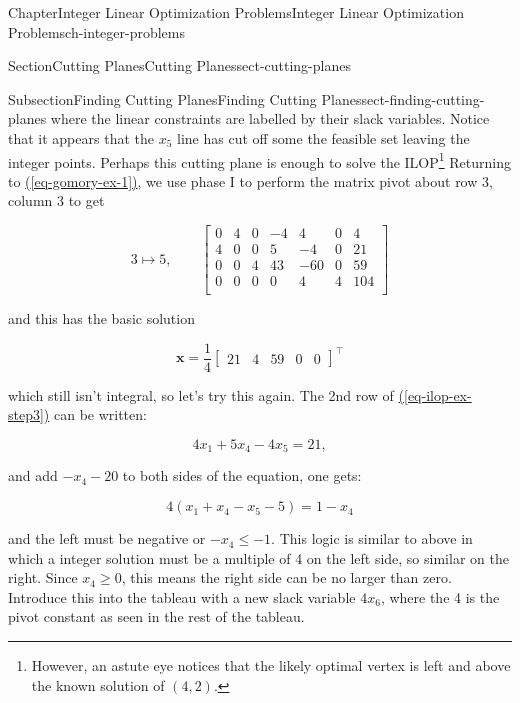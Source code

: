 \documentclass[oneside,10pt,]{book}
\newcommand{\xreffont}{\relax}
\numberwithin{equation}{section}
\newcommand{\amp}{&}
\begin{document}
\begin{chapterptx}{Chapter}{Integer Linear Optimization Problems}{}{Integer Linear Optimization Problems}{}{}{ch-integer-problems}
\begin{sectionptx}{Section}{Cutting Planes}{}{Cutting Planes}{}{}{sect-cutting-planes}
\begin{subsectionptx}{Subsection}{Finding Cutting Planes}{}{Finding Cutting Planes}{}{}{sect-finding-cutting-planes}
where the linear constraints are labelled by their slack variables. Notice that it appears that the \(x_5\) line has cut off some the feasible set leaving the integer points. Perhaps this cutting plane is enough to solve the ILOP\footnote{However, an astute eye notices that the likely optimal vertex is left and above the known solution of \((4,2)\).\label{sect-finding-cutting-planes-18-2}} Returning to \hyperref[eq-gomory-ex-1]{({\xreffont\ref{eq-gomory-ex-1}})}, we use phase I to perform the matrix pivot about row 3, column 3 to get%
\par
%
\begin{equation}
3 \mapsto 5, \qquad \left[\begin{array}{rr|rrrr|r} 0 \amp 4 \amp 0 \amp -4 \amp 4 \amp 0 \amp 4\\ 4 \amp 0 \amp 0 \amp 5 \amp -4 \amp 0 \amp 21\\ 0 \amp 0 \amp 4 \amp 43 \amp -60 \amp 0 \amp 59\\ \hline 0 \amp 0 \amp 0 \amp 0 \amp 4 \amp 4 \amp 104\\ \end{array} \right]\label{eq-ilop-ex-step3}
\end{equation}
%
\par
and this has the basic solution%
\par
%
\begin{equation*}
\boldsymbol{x} = \frac{1}{4} \left[\begin{array}{rr|rrr} 21 \amp 4 \amp 59 \amp 0 \amp 0 \end{array} \right]^{\intercal}
\end{equation*}
%
\par
which still isn't integral, so let's try this again. The 2nd row of \hyperref[eq-ilop-ex-step3]{({\xreffont\ref{eq-ilop-ex-step3}})} can be written:%
\par
%
\begin{equation*}
4x_1 + 5x_4 -4x_5 = 21,
\end{equation*}
%
\par
and add \(-x_{4} -20\) to both sides of the equation, one gets:%
\par
%
\begin{equation*}
4(x_1+x_4-x_5-5) = 1-x_4
\end{equation*}
%
\par
and the left must be negative or \(-x_{4} \leq -1\). This logic is similar to above in which a integer solution must be a multiple of 4 on the left side, so similar on the right.  Since \(x_4 \geq 0\), this means the right side can be no larger than zero. Introduce this into the tableau with a new slack variable \(4x_6\), where the 4 is the pivot constant as seen in the rest of the tableau.%

\end{subsectionptx}
\end{sectionptx}
\end{chapterptx}
\end{document}
